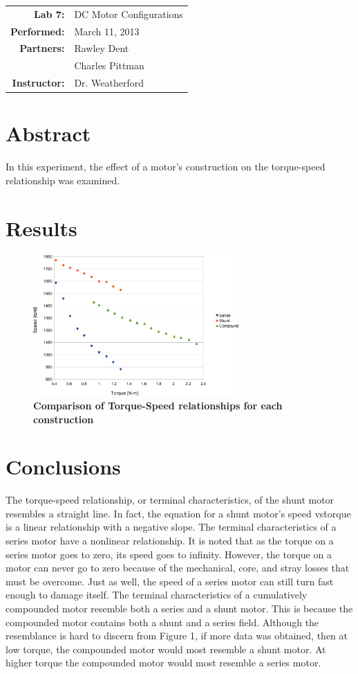 \documentclass{article}
\begin{document}
\begin{tabular}{rl}
  \textbf{Lab 7:} & DC Motor Configurations \\
  \textbf{Performed:} & March 11, 2013 \\
  \textbf{Partners:} & Rawley Dent \\ & Charles Pittman \\
  \textbf{Instructor:} & Dr. Weatherford
\end{tabular}


\section*{Abstract}

In this experiment, the effect of a motor's construction on the torque-speed
relationship was examined.

\section*{Results}

\begin{figure}[H]
  \centering
    \includegraphics[width=0.7\textwidth]{img/graph}
    \caption{\textbf{Comparison of Torque-Speed relationships for each
    construction}}
    \label{fig:graph}
\end{figure}

\section*{Conclusions}

The torque-speed relationship, or terminal characteristics, of the shunt motor
resembles a straight line. In fact, the equation for a shunt motor’s speed vs\.
torque is a linear relationship with a negative slope. The terminal
characteristics of a series motor have a nonlinear relationship. It is noted
that as the torque on a series motor goes to zero, its speed goes to infinity.
However, the torque on a motor can never go to zero because of the mechanical,
core, and stray losses that must be overcome. Just as well, the speed of a
series motor can still turn fast enough to damage itself. The terminal
characteristics of a cumulatively compounded motor resemble both a series and a
shunt motor. This is because the compounded motor contains both a shunt and a
series field. Although the resemblance is hard to discern from Figure 1, if
more data was obtained, then at low torque, the compounded motor would most
resemble a shunt motor.  At higher torque the compounded motor would most
resemble a series motor.
\end{document}
